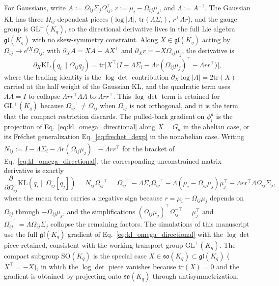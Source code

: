 \documentclass[11pt]{article}
\begin{document}
For Gaussians, write $A := \Omega_{ij}\Sigma_j\Omega_{ij}^\top$, $r := \mu_i - \Omega_{ij}\mu_j$, and $\Lambda := A^{-1}$. The Gaussian KL has three $\Omega_{ij}$-dependent pieces ($\log|A|$, $\mathrm{tr}(\Lambda\Sigma_i)$, $r^\top\Lambda r$), and the gauge group is $\mathrm{GL}^+(K_q)$, so the directional derivative lives in the full Lie algebra $\mathfrak{gl}(K_q)$ with no skew-symmetry constraint. Along $X \in \mathfrak{gl}(K_q)$ acting by $\Omega_{ij} \to e^{tX}\Omega_{ij}$, with $\partial_X A = XA + AX^\top$ and $\partial_X r = -X\Omega_{ij}\mu_j$, the derivative is
\begin{equation}
\partial_X\mathrm{KL}(q_i\|\Omega_{ij}q_j) = \mathrm{tr}\Big[X^\top\Big(I - \Lambda\Sigma_i - \Lambda r(\Omega_{ij}\mu_j)^\top - \Lambda r r^\top\Big)\Big],
\label{eq:kl_omega_directional}
\end{equation}
where the leading identity is the $\log\det$ contribution $\partial_X\log|A| = 2\mathrm{tr}(X)$ carried at the half weight of the Gaussian KL, and the quadratic term uses $\Lambda A = I$ to collapse $\Lambda r r^\top\Lambda A$ to $\Lambda r r^\top$. This $\log\det$ term is retained for $\mathrm{GL}^+(K_q)$ because $\Omega_{ij}^{-\top} \neq \Omega_{ij}$ when $\Omega_{ij}$ is not orthogonal, and it is the term that the compact restriction discards. The pulled-back gradient on $\phi_i^a$ is the projection of Eq.~\eqref{eq:kl_omega_directional} along $X = G_a$ in the abelian case, or its Fr\'echet generalization Eq.~\eqref{eq:frechet_dexp} in the nonabelian case. Writing $N_{ij} := I - \Lambda\Sigma_i - \Lambda r(\Omega_{ij}\mu_j)^\top - \Lambda r r^\top$ for the bracket of Eq.~\eqref{eq:kl_omega_directional}, the corresponding unconstrained matrix derivative is exactly
\begin{equation}
\frac{\partial}{\partial \Omega_{ij}}\mathrm{KL}(q_i \| \Omega_{ij}[q_j]) = N_{ij}\Omega_{ij}^{-\top} = \Omega_{ij}^{-\top} - \Lambda \Sigma_i \Omega_{ij}^{-\top} - \Lambda(\mu_i - \Omega_{ij}\mu_j)\mu_j^\top - \Lambda r r^\top \Lambda \Omega_{ij}\Sigma_j,
\label{eq:kl_omega_unconstrained}
\end{equation}
where the mean term carries a negative sign because $r = \mu_i - \Omega_{ij}\mu_j$ depends on $\Omega_{ij}$ through $-\Omega_{ij}\mu_j$, and the simplifications $(\Omega_{ij}\mu_j)^\top\Omega_{ij}^{-\top} = \mu_j^\top$ and $\Omega_{ij}^{-\top} = \Lambda\Omega_{ij}\Sigma_j$ collapse the remaining factors. The simulations of this manuscript use the full $\mathfrak{gl}(K_q)$ gradient of Eq.~\eqref{eq:kl_omega_directional} with the $\log\det$ piece retained, consistent with the working transport group $\mathrm{GL}^+(K_q)$. The compact subgroup $\mathrm{SO}(K_q)$ is the special case $X \in \mathfrak{so}(K_q) \subset \mathfrak{gl}(K_q)$ ($X^\top = -X$), in which the $\log\det$ piece vanishes because $\mathrm{tr}(X) = 0$ and the gradient is obtained by projecting onto $\mathfrak{so}(K_q)$ through antisymmetrization.
\end{document}
